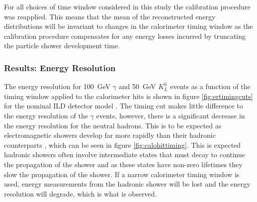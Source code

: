 For all choices of time window considered in this study the calibration procedure was reapplied.  This means that the mean of the reconstructed energy distributions will be invariant to changes in the calorimeter timing window as the calibration procedure compensates for any energy losses incurred by truncating the particle shower development time.  


\subsubsection{Results: Energy Resolution}
The energy resolution for 100~GeV $\gamma$ and 50~GeV $K^{0}_{L}$ events as a function of the timing window applied to the calorimeter hits is shown in figure \ref{fig:ertimingcuts} for the nominal ILD detector model .  The timing cut makes little difference to the energy resolution of the $\gamma$ events, however, there is a significant decrease in the energy resolution for the neutral hadrons.  This is to be expected as electromagnetic showers develop far more rapidly than their hadronic counterparts \cite{Wigmans:2000vf}, which can be seen in figure \ref{fig:calohittiming}.  This is expected hadronic showers often involve intermediate states that must decay to continue the propagation of the shower and as these states have non-zero lifetimes they slow the propagation of the shower.  If a narrow calorimeter timing window is used, energy measurements from the hadronic shower will be lost and the energy resolution will degrade, which is what is observed.  

